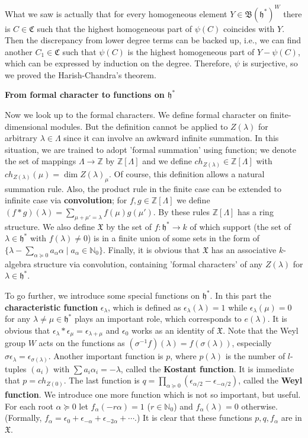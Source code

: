 \documentclass{article}
\newcommand{\NaN}{\mathbb{N}}
\newcommand{\InZ}{\mathbb{Z}}
\newcommand{\SBar}{\;|\;}
\newcommand{\lie}[1]{\mathfrak{#1}}
\begin{document}
What we saw is actually that for every homogeneous element $Y \in \mathfrak{B}(\lie{h}^*)^W$ there is $C \in \mathfrak{C}$ such that the highest homogeneous part of $\psi(C)$ coincides with $Y$.
Then the discrepancy from lower degree terms can be backed up, i.e., we can find another $C_1 \in \mathfrak{C}$ such that $\psi(C)$ is the highest homogeneous part of $Y - \psi(C)$, which can be expressed by induction on the degree.
Therefore, $\psi$ is surjective, so we proved the Harish-Chandra's theorem.

\newpage

\textbf{From formal character to functions on $\lie{h}^*$}

Now we look up to the formal characters.
We define formal character on finite-dimensional modules.
But the definition cannot be applied to $Z(\lambda)$ for arbitrary $\lambda \in \Lambda$ since it can involve an awkward infinite summation.
In this situation, we are trained to adopt 'formal summation' using function; we denote the set of mappings $\Lambda \to \InZ$ by $\InZ[\Lambda]$ and we define $ch_{Z(\lambda)} \in \InZ[\Lambda]$ with $ch_{Z(\lambda)}(\mu) = \dim{Z(\lambda)_\mu}$.
Of course, this definition allows a natural summation rule.
Also, the product rule in the finite case can be extended to infinite case via \textbf{convolution}; for $f, g \in \InZ[\Lambda]$ we define $(f * g)(\lambda) = \sum_{\mu + \mu' = \lambda} f(\mu) g(\mu')$.
By these rules $\InZ[\Lambda]$ has a ring structure.
We also define $\mathfrak{X}$ by the set of $f : \lie{h}^* \to k$ of which support (the set of $\lambda \in \lie{h}^*$ with $f(\lambda) \ne 0$) is in a finite union of some sets in the form of $\{\lambda - \sum_{\alpha \succeq 0} a_\alpha \alpha \SBar a_\alpha \in \NaN_0\}$.
Finally, it is obvious that $\mathfrak{X}$ has an associative $k$-algebra structure via convolution, containing 'formal characters' of any $Z(\lambda)$ for $\lambda \in \lie{h}^*$.

To go further, we introduce some special functions on $\lie{h}^*$.
In this part the \textbf{characteristic function} $\epsilon_{\lambda}$, which is defined as $\epsilon_{\lambda}(\lambda) = 1$ while $\epsilon_{\lambda}(\mu) = 0$ for any $\lambda \ne \mu \in \lie{h}^*$ plays an important role, which corresponds to $e(\lambda)$.
It is obvious that $\epsilon_\lambda * \epsilon_\mu = \epsilon_{\lambda + \mu}$ and $\epsilon_0$ works as an identity of $\mathfrak{X}$.
Note that the Weyl group $W$ acts on the functions as $(\sigma^{-1} f)(\lambda) = f(\sigma(\lambda))$, especially $\sigma \epsilon_\lambda = \epsilon_{\sigma(\lambda)}$.
Another important function is $p$, where $p(\lambda)$ is the number of $l$-tuples $(a_i)$ with $\sum a_i \alpha_i = -\lambda$, called the \textbf{Kostant function}.
It is immediate that $p = ch_{Z(0)}$.
The last function is $q = \prod_{\alpha \succeq 0} (\epsilon_{\alpha / 2} - \epsilon_{-\alpha / 2})$, called the \textbf{Weyl function}.
We introduce one more function which is not so important, but useful.
For each root $\alpha \succeq 0$ let $f_\alpha(-r\alpha) = 1$ ($r \in \NaN_0$) and $f_\alpha(\lambda) = 0$ otherwise.
(Formally, $f_\alpha = \epsilon_0 + \epsilon_{-\alpha} + \epsilon_{-2\alpha} + \cdots$.)
It is clear that these functions $p, q, f_\alpha$ are in $\mathfrak{X}$.
\end{document}
